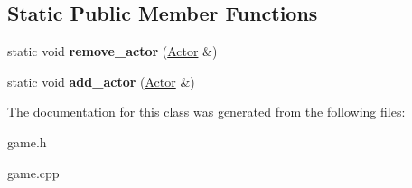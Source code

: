 \subsection*{Static Public Member Functions}
\begin{DoxyCompactItemize}
\item 
\hypertarget{classda__game_1_1Game_ad931dedb8d1ee29619040b02ccfbb56c}{
static void {\bfseries remove\_\-actor} (\hyperlink{classda__game_1_1Actor}{Actor} \&)}
\label{classda__game_1_1Game_ad931dedb8d1ee29619040b02ccfbb56c}

\item 
\hypertarget{classda__game_1_1Game_aa255ef7e073d8aba8468af6211795aa0}{
static void {\bfseries add\_\-actor} (\hyperlink{classda__game_1_1Actor}{Actor} \&)}
\label{classda__game_1_1Game_aa255ef7e073d8aba8468af6211795aa0}

\end{DoxyCompactItemize}


The documentation for this class was generated from the following files:\begin{DoxyCompactItemize}
\item 
game.h\item 
game.cpp\end{DoxyCompactItemize}
